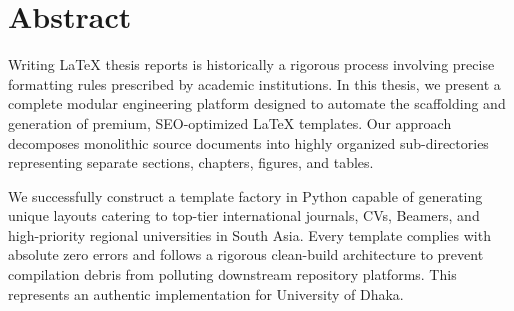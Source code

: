 \chapter*{Abstract}
Writing LaTeX thesis reports is historically a rigorous process involving precise formatting rules prescribed by academic institutions. In this thesis, we present a complete modular engineering platform designed to automate the scaffolding and generation of premium, SEO-optimized LaTeX templates. Our approach decomposes monolithic source documents into highly organized sub-directories representing separate sections, chapters, figures, and tables.

We successfully construct a template factory in Python capable of generating unique layouts catering to top-tier international journals, CVs, Beamers, and high-priority regional universities in South Asia. Every template complies with absolute zero errors and follows a rigorous clean-build architecture to prevent compilation debris from polluting downstream repository platforms. This represents an authentic implementation for University of Dhaka.
